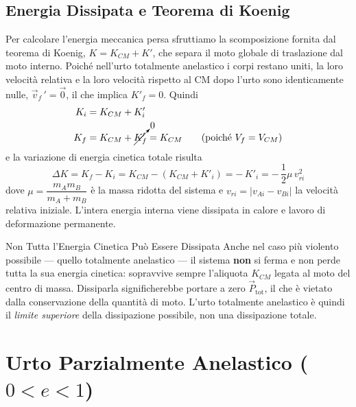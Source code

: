 \subsection{Energia Dissipata e Teorema di Koenig}

Per calcolare l'energia meccanica persa sfruttiamo la scomposizione fornita dal teorema di Koenig, $K = K_{CM} + K'$, che separa il moto globale di traslazione dal moto interno. Poiché nell'urto totalmente anelastico i corpi restano uniti, la loro velocità relativa e la loro velocità rispetto al CM dopo l'urto sono identicamente nulle, $\vec{v}_f\,' = \vec{0}$, il che implica $K'_f = 0$. Quindi
\begin{align*}
    K_i &= K_{CM} + K'_i \\
    K_f &= K_{CM} + \cancelto{0}{K'_f} = K_{CM}
    \qquad \text{(poiché } V_f = V_{CM}\text{)}
\end{align*}
e la variazione di energia cinetica totale risulta
\begin{equation}
    \Delta K = K_f - K_i = K_{CM} - (K_{CM} + K'_i)
             = -\,K'_i = -\,\frac{1}{2}\mu \, v_{ri}^2
\end{equation}
dove $\mu = \dfrac{m_A m_B}{m_A + m_B}$ è la massa ridotta del sistema e $v_{ri} = |v_{Ai} - v_{Bi}|$ la velocità relativa iniziale. L'intera energia interna viene dissipata in calore e lavoro di deformazione permanente.

\begin{attenzione}{Non Tutta l'Energia Cinetica Può Essere Dissipata}
Anche nel caso più violento possibile --- quello totalmente anelastico --- il sistema \textbf{non} si ferma e non perde tutta la sua energia cinetica: sopravvive sempre l'aliquota $K_{CM}$ legata al moto del centro di massa. Dissiparla significherebbe portare a zero $\vec{P}_{\text{tot}}$, il che è vietato dalla conservazione della quantità di moto. L'urto totalmente anelastico è quindi il \emph{limite superiore} della dissipazione possibile, non una dissipazione totale.
\end{attenzione}

\section{Urto Parzialmente Anelastico ($0 < e < 1$)}

